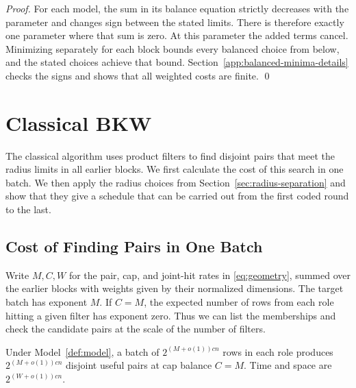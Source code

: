 \documentclass[runningheads,envcountsame,envcountsect,orivec]{llncs}
\begin{document}
\begin{proof}
For each model, the sum in its balance equation strictly decreases
with the parameter and changes sign between the stated limits.
There is therefore exactly one parameter where that sum is zero.
At this parameter the added terms cancel. Minimizing separately
for each block bounds every balanced choice from below, and the
stated choices achieve that bound.
Section~\ref{app:balanced-minima-details} checks the signs and
shows that all weighted costs are finite.
\qed
\end{proof}


\section{Classical BKW}
\label{sec:classical}

The classical algorithm uses product filters to find disjoint
pairs that meet the radius limits in all earlier blocks.
We first calculate the cost of this search in one batch.
We then apply the radius choices from
Section~\ref{sec:radius-separation} and show that they give
a schedule that can be carried out from the first coded round to
the last.

\subsection{Cost of Finding Pairs in One Batch}

Write $M,C,W$ for the pair, cap, and joint-hit rates in
\eqref{eq:geometry}, summed over the earlier blocks with
weights given by their normalized dimensions. The target batch
has exponent $M$. If $C=M$, the expected number of rows from each
role hitting a given filter has exponent zero. Thus we can list
the memberships and check the candidate pairs at the scale of
the number of filters.

\begin{lemma}
\label{lem:batch}
Under Model~\ref{def:model}, a batch of
$2^{(M+o(1))cn}$ rows in each role produces $2^{(M+o(1))cn}$
disjoint useful pairs at cap balance $C=M$. Time and space are
$2^{(W+o(1))cn}$.
\end{lemma}
\end{document}
